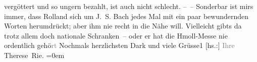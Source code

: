 \begin{ledgroupsized}[t]{13cm}
               vergöttert und so ungern bezahlt, ist auch nicht schlecht.\pend
           \pstart
           – – Sonderbar ist mirs immer, dass Rolland sich
               um J. S. Bach jedes Mal mit ein paar bewundernden
               Worten herumdrückt; aber ihm nie recht in die Nähe will. Vielleicht gibts da trotz
               allem doch nationale Schranken – oder er hat die Hmoll-Messe nie ordentlich gehö\textcolor{gray}{rt}\pend
           \pstart
           Nochmals herzlichsten Dark und viele Grüsse1\pend
           \pstart
           {[}hs.:{]} \textcolor{gray}{Ihre}{\\[\baselineskip]}\spacefill\mbox{Therese Rie.}\pend
           \leftskip=0em{}
         
         \endnumbering{}\end{ledgroupsized}  \newcommand{\dateiname}{L02576}\newcommand{\titel}{Therese Rie-Andro an Arthur Schnitzler, 30. 9. 1923}\newcommand{\editorInnen}{Martin Anton Müller und Gerd-Hermann Susen}
      
